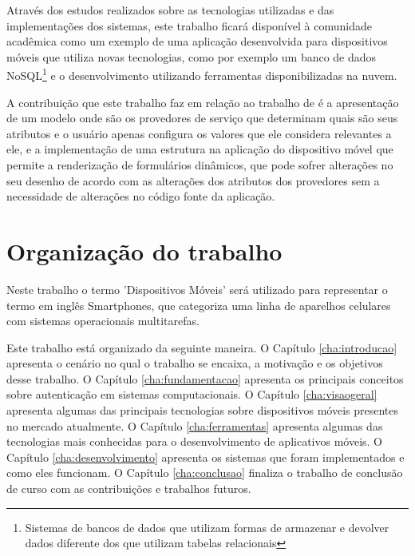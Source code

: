Através dos estudos realizados sobre as tecnologias utilizadas e das implementações dos sistemas, este trabalho ficará disponível à comunidade acadêmica como um exemplo de uma aplicação desenvolvida para dispositivos móveis que utiliza novas tecnologias, como por exemplo um banco de dados NoSQL\footnote{Sistemas de bancos de dados que utilizam formas de armazenar e devolver dados diferente dos que utilizam tabelas relacionais} e o desenvolvimento utilizando ferramentas disponibilizadas na nuvem.

A contribuição que este trabalho faz em relação ao trabalho de \cite{praca12} é a apresentação de um modelo onde são os provedores de serviço que determinam quais são seus atributos e o usuário apenas configura os valores que ele considera relevantes a ele, e a implementação de uma estrutura na aplicação do dispositivo móvel que permite a renderização de formulários dinâmicos, que pode sofrer alterações no seu desenho de acordo com as alterações dos atributos dos provedores sem a necessidade de alterações no código fonte da aplicação.

\section{Organização do trabalho}
Neste trabalho o termo 'Dispositivos Móveis' será utilizado para representar o termo em inglês Smartphones, que categoriza uma linha de aparelhos celulares com sistemas operacionais multitarefas.

Este trabalho está organizado da seguinte maneira. O Capítulo \ref{cha:introducao} apresenta o cenário no qual o trabalho se encaixa, a motivação e os objetivos desse trabalho. O Capítulo \ref{cha:fundamentacao} apresenta os principais conceitos sobre autenticação em sistemas computacionais. O Capítulo \ref{cha:visaogeral} apresenta algumas das principais tecnologias sobre dispositivos móveis presentes no mercado atualmente. O Capítulo \ref{cha:ferramentas} apresenta algumas das tecnologias mais conhecidas para o desenvolvimento de aplicativos móveis. O Capítulo \ref{cha:desenvolvimento} apresenta os sistemas que foram implementados e como eles funcionam. O Capítulo \ref{cha:conclusao} finaliza o trabalho de conclusão de curso com as contribuições e trabalhos futuros.